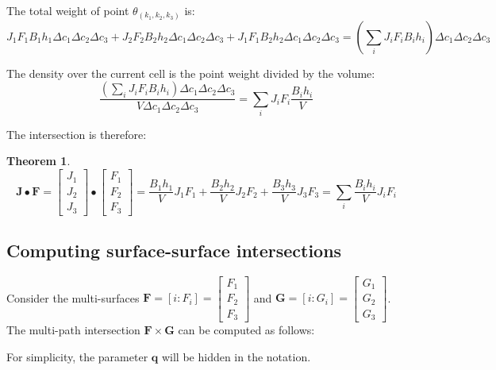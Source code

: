 \documentclass{book}
\newtheorem{thm}{Theorem}
\begin{document}
The total weight of point \(\theta_{(k_1,k_2,k_3)}\) is: 
\[J_1 F_1 B_1 h_1 \Delta c_1 \Delta c_2 \Delta c_3 + J_2 F_2 B_2 h_2 \Delta c_1 \Delta c_2 \Delta c_3 + J_1 F_1 B_2 h_2 \Delta c_1 \Delta c_2 \Delta c_3 
= \left(\sum_i J_i F_i B_i h_i\right) \Delta c_1 \Delta c_2 \Delta c_3\]

The density over the current cell is the point weight divided by the volume:
\[\frac{\left(\sum_i J_i F_i B_i h_i\right) \Delta c_1 \Delta c_2 \Delta c_3}{V \Delta c_1 \Delta c_2 \Delta c_3} = \sum_i J_i F_i \frac{B_i h_i}{V}\]

The intersection is therefore:

\begin{thm}
\[\mathbf{J} \bullet \mathbf{F} = \begin{bmatrix} J_1 \\ J_2 \\ J_3 \end{bmatrix} \bullet \begin{bmatrix} F_1 \\ F_2 \\ F_3 \end{bmatrix} = \frac{B_1 h_1}{V} J_1 F_1 + \frac{B_2 h_2}{V} J_2 F_2 + \frac{B_3 h_3}{V} J_3 F_3 = \sum_i \frac{B_i h_i}{V} J_i F_i\]
\end{thm}



\subsection*{Computing surface-surface intersections}

Consider the multi-surfaces \(\mathbf{F} = [i : F_i] = \begin{bmatrix} F_1 \\ F_2 \\ F_3 \end{bmatrix}\) and \(\mathbf{G} = [i : G_i] = \begin{bmatrix} G_1 \\ G_2 \\ G_3 \end{bmatrix}\). The multi-path intersection \(\mathbf{F} \times \mathbf{G}\) can be computed as follows:

For simplicity, the parameter \(\mathbf{q}\) will be hidden in the notation.

\vspace{1mm}
\end{document}
